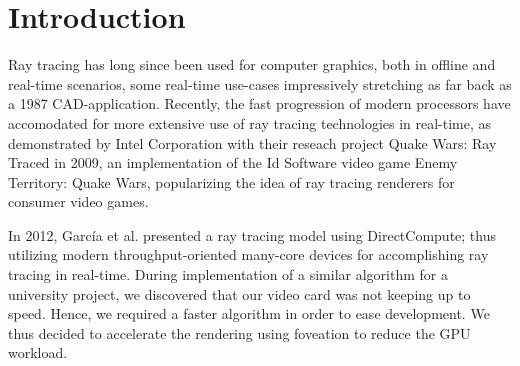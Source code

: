 \section{Introduction}
Ray tracing has long since been used for computer graphics, both in offline and real-time scenarios, some real-time use-cases impressively stretching as far back as a 1987 CAD-application\cite{stay87}.
Recently, the fast progression of modern processors have accomodated for more extensive use of ray tracing technologies in real-time, as demonstrated by Intel Corporation with their reseach project Quake Wars: Ray Traced in 2009\cite{pohl09}, an implementation of the Id Software video game Enemy Territory: Quake Wars, popularizing the idea of ray tracing renderers for consumer video games.

In 2012, Garc\'ia et al. presented a ray tracing model using DirectCompute\cite{garcia12}; thus utilizing modern throughput-oriented many-core devices for accomplishing ray tracing in real-time.
During implementation of a similar algorithm for a university project, we discovered that our video card was not keeping up to speed.
Hence, we required a faster algorithm in order to ease development.
We thus decided to accelerate the rendering using foveation to reduce the GPU workload.
